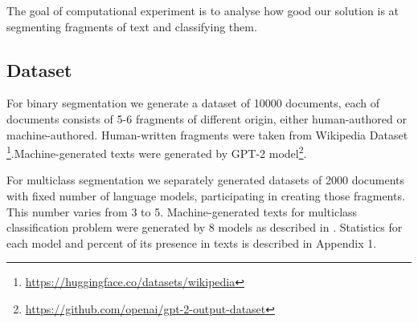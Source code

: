 \documentclass{article}
\begin{document}
The goal of computational experiment is to analyse how good our solution is at segmenting fragments of text and classifying them. 



\subsection{Dataset}

For binary segmentation we generate a dataset of 10000 documents, each of documents consists of 5-6 fragments of different origin, either human-authored or machine-authored. Human-written fragments were taken from Wikipedia Dataset \footnote{\url{https://huggingface.co/datasets/wikipedia}}.Machine-generated texts were generated by GPT-2 model\footnote{\url{https://github.com/openai/gpt-2-output-dataset}}.

For multiclass segmentation we separately generated datasets of 2000 documents with fixed number of language models, participating in creating those fragments. This number varies from 3 to 5. Machine-generated texts for multiclass classification problem were generated by 8 models as described in \cite{uchendu-etal-2020-authorship}. Statistics for each model and percent of its presence in texts is described in Appendix 1. \\

\end{document}
